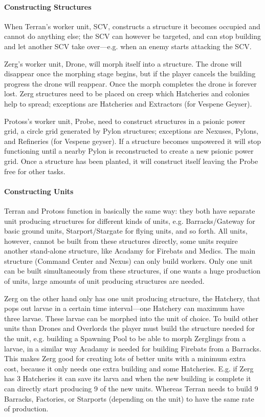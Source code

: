 \paragraph{Constructing Structures}
When Terran's worker unit, SCV, constructs a structure it becomes occupied and cannot do anything else; the SCV can however be targeted, and can stop building and let another SCV take over—e.g. when an enemy starts attacking the SCV.

Zerg’s worker unit, Drone, will morph itself into a structure. The drone will disappear once the morphing stage begins, but if the player cancels the building progress the drone will reappear. Once the morph completes the drone is forever lost. Zerg structures need to be placed on creep which Hatcheries and colonies help to spread; exceptions are Hatcheries and Extractors (for Vespene Geyser).

Protoss’s worker unit, Probe, need to construct structures in a psionic power grid, a circle grid generated by Pylon structures; exceptions are Nexuses, Pylons, and Refineries (for Vespene geyser). If a structure becomes unpowered it will stop functioning until a nearby Pylon is reconstructed to create a new psionic power grid. Once a structure has been planted, it will construct itself leaving the Probe free for other tasks.

\paragraph{Constructing Units}
Terran and Protoss function in basically the same way: they both have separate unit producing structures for different kinds of units, e.g. Barracks/Gateway for basic ground units, Starport/Stargate for flying units, and so forth. All units, however, cannot be built from these structures directly, some units require another stand-alone structure, like Acadamy for Firebats and Medics. The main structure (Command Center and Nexus) can only build workers. Only one unit can be built simultaneously from these structures, if one wants a huge production of units, large amounts of unit producing structures are needed.

Zerg on the other hand only has one unit producing structure, the Hatchery, that pops out larvae in a certain time interval—one Hatchery can maximum have three larvae. These larvae can be morphed into the unit of choice. To build other units than Drones and Overlords the player must build the structure needed for the unit, e.g. building a Spawning Pool to be able to morph Zerglings from a larvae, in a similar way Acadamy is needed for building Firebats from a Barracks. This makes Zerg good for creating lots of better units with a minimum extra cost, because it only needs one extra building and some Hatcheries. E.g. if Zerg has 3 Hatcheries it can save its larva and when the new building is complete it can directly start producing 9 of the new units. Whereas Terran needs to build 9 Barracks, Factories, or Starports (depending on the unit) to have the same rate of production.

